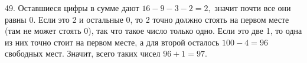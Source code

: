 49. Оставшиеся цифры в сумме дают $16-9-3-2=2,$ значит почти все они равны 0. Если это 2 и остальные 0, то 2 точно должно стоять на первом месте (там не может стоять 0), так что такое число только одно. Если это две 1, то одна из них точно стоит на первом месте, а для второй осталось $100-4=96$ свободных мест. Значит, всего таких чисел $96+1=97.$\\
